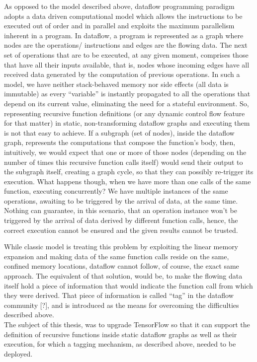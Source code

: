 \documentclass[ack,preface]{dithesis}
\begin{document}
As opposed to the model described above, dataflow programming paradigm adopts a data driven computational model which allows the instructions to be executed out of order and in parallel and exploits the maximum parallelism inherent in a program. In dataflow, a program is represented as a graph where nodes are the operations/ instructions and edges are the flowing data. The next set of operations that are to be executed, at any given moment, comprises those that have all their inputs available, that is, nodes whose incoming edges have all received data generated by the computation of previous operations. In such a model, we have neither stack-behaved memory nor side effects (all data is immutable) as every “variable” is instantly propagated to all the operations that depend on its current value, eliminating the need for a stateful environment. So, representing recursive function definitions (or any dynamic control flow feature for that matter) in static, non-transforming dataflow graphs and executing them is not that easy to achieve. If a subgraph (set of nodes), inside the dataflow graph, represents the computations that compose the function’s body, then, intuitively, we would expect that one or more of those nodes (depending on the number of times this recursive function calls itself) would send their output to the subgraph itself, creating a graph cycle, so that they can possibly re-trigger its execution. What happens though, when we have more than one calls of the same function, executing concurrently?  We have multiple instances of the same operations, awaiting to be triggered by the arrival of data, at the same time. Nothing can guarantee, in this scenario, that an operation instance won’t be triggered by the arrival of data derived by different function calls, hence, the correct execution cannot be ensured and the given results cannot be trusted.

While classic model is treating this problem by exploiting the linear memory expansion and making data of the same function calls reside on the same, confined memory locations, dataflow cannot follow, of course, the exact same approach. The equivalent of that solution, would be, to make the flowing data itself hold a piece of information that would indicate the function call from which they were derived. That piece of information is called “tag” in the dataflow community [?], and is introduced as the means for overcoming the difficulties described above.\\

The subject of this thesis, was to upgrade TensorFlow so that it can support the definition of recursive functions inside static dataflow graphs as well as their execution, for which a tagging mechanism, as described above, needed to be deployed.
\end{document}
